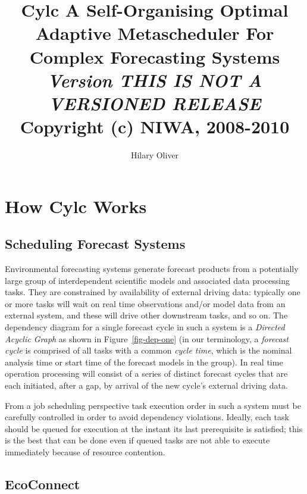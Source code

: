 \documentclass[11pt,a4paper]{article}
\title{Cylc \linebreak 
A Self-Organising Optimal Adaptive Metascheduler \linebreak 
For Complex Forecasting Systems \linebreak 
{\em \small Version THIS IS NOT A VERSIONED RELEASE} \linebreak
{\small Copyright (c) NIWA, 2008-2010} }
\author{Hilary Oliver}
\begin{document}
\maketitle

\pagebreak



\pagebreak
\tableofcontents
\listoffigures

\pagebreak
\section{How Cylc Works} 
\label{HowCylcWorks}

\subsection{Scheduling Forecast Systems} 
\label{SchedulingForecastSystems}

Environmental forecasting systems generate forecast products from a
potentially large group of interdependent scientific models and
associated data processing tasks. They are constrained by availability
of external driving data: typically one or more tasks will wait on real
time observations and/or model data from an external system, and these
will drive other downstream tasks, and so on. The dependency diagram for
a single forecast cycle in such a system is a {\em Directed Acyclic
Graph} as shown in Figure~\ref{fig-dep-one} (in our terminology, a {\em
forecast cycle} is comprised of all tasks with a common {\em cycle
time}, which is the nominal analysis time or start time of the forecast
models in the group). In real time operation processing will consist of
a series of distinct forecast cycles that are each initiated, after a
gap, by arrival of the new cycle's external driving data.

From a job scheduling perspective task execution order in such a system
must be carefully controlled in order to avoid dependency violations.
Ideally, each task should be queued for execution at the instant its
last prerequisite is satisfied; this is the best that can be done even
if queued tasks are not able to execute immediately because of resource
contention.

\subsection{EcoConnect} 
\label{EcoConnect}
\end{document}
